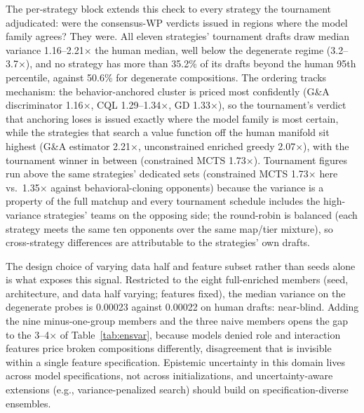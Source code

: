 \documentclass[journal]{IEEEtran}
\begin{document}
The per-strategy block extends this check to every strategy the tournament adjudicated: were the consensus-WP verdicts issued in regions where the model family agrees? They were. All eleven strategies' tournament drafts draw median variance 1.16--2.21$\times$ the human median, well below the degenerate regime (3.2--3.7$\times$), and no strategy has more than 35.2\% of its drafts beyond the human 95th percentile, against 50.6\% for degenerate compositions. The ordering tracks mechanism: the behavior-anchored cluster is priced most confidently (G\&A discriminator 1.16$\times$, CQL 1.29--1.34$\times$, GD 1.33$\times$), so the tournament's verdict that anchoring loses is issued exactly where the model family is most certain, while the strategies that search a value function off the human manifold sit highest (G\&A estimator 2.21$\times$, unconstrained enriched greedy 2.07$\times$), with the tournament winner in between (constrained MCTS 1.73$\times$). Tournament figures run above the same strategies' dedicated sets (constrained MCTS 1.73$\times$ here vs.\ 1.35$\times$ against behavioral-cloning opponents) because the variance is a property of the full matchup and every tournament schedule includes the high-variance strategies' teams on the opposing side; the round-robin is balanced (each strategy meets the same ten opponents over the same map/tier mixture), so cross-strategy differences are attributable to the strategies' own drafts.

The design choice of varying data half and feature subset rather than seeds alone is what exposes this signal. Restricted to the eight full-enriched members (seed, architecture, and data half varying; features fixed), the median variance on the degenerate probes is 0.00023 against 0.00022 on human drafts: near-blind. Adding the nine minus-one-group members and the three naive members opens the gap to the 3--4$\times$ of Table~\ref{tab:ensvar}, because models denied role and interaction features price broken compositions differently, disagreement that is invisible within a single feature specification. Epistemic uncertainty in this domain lives across model specifications, not across initializations, and uncertainty-aware extensions (e.g., variance-penalized search) should build on specification-diverse ensembles.
\end{document}

